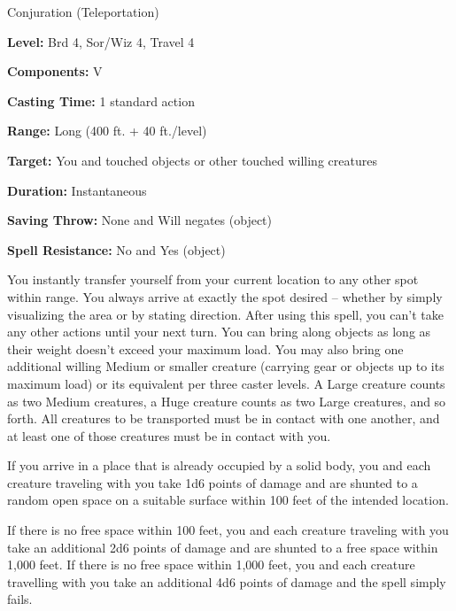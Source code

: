 
Conjuration (Teleportation)

\textbf{Level:} Brd 4, Sor/Wiz 4, Travel 4

\textbf{Components:} V

\textbf{Casting Time:} 1 standard action

\textbf{Range:} Long (400 ft. + 40 ft./level)

\textbf{Target:} You and touched objects or other touched willing creatures

\textbf{Duration:} Instantaneous

\textbf{Saving Throw:} None and Will negates (object)

\textbf{Spell Resistance:} No and Yes (object)

You instantly transfer yourself from your current location to any other spot within 
range. You always arrive at exactly the spot desired -- whether by simply visualizing 
the area or by stating direction. After using this spell, you can't take any other 
actions until your next turn. You can bring along objects as long as their weight 
doesn't exceed your maximum load. You may also bring one additional willing Medium 
or smaller creature (carrying gear or objects up to its maximum load) or its equivalent 
per three caster levels. A Large creature counts as two Medium creatures, a Huge 
creature counts as two Large creatures, and so forth. All creatures to be transported 
must be in contact with one another, and at least one of those creatures must be 
in contact with you.

If you arrive in a place that is already occupied by a solid body, you and each 
creature traveling with you take 1d6 points of damage and are shunted to a random 
open space on a suitable surface within 100 feet of the intended location.

If there is no free space within 100 feet, you and each creature traveling with 
you take an additional 2d6 points of damage and are shunted to a free space within 
1,000 feet. If there is no free space within 1,000 feet, you and each creature 
travelling with you take an additional 4d6 points of damage and the spell simply 
fails.

